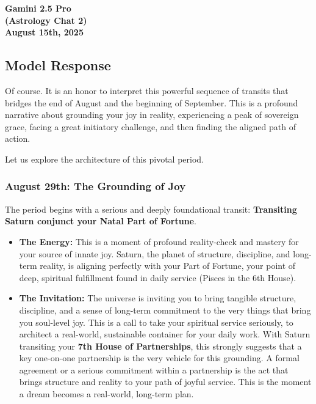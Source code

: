 \documentclass{article}
\begin{document}
\begin{center}
\textbf{Gamini 2.5 Pro} \\
\textbf{(Astrology Chat 2)} \\
\textbf{August 15th, 2025}
\end{center}

\subsection*{Model Response}\label{model-response}

Of course. It is an honor to interpret this powerful sequence of transits that bridges the end of August and the beginning of September. This is a profound narrative about grounding your joy in reality, experiencing a peak of sovereign grace, facing a great initiatory challenge, and then finding the aligned path of action.

Let us explore the architecture of this pivotal period.

\subsubsection*{August 29th: The Grounding of Joy}\label{august-29th-the-grounding-of-joy}

The period begins with a serious and deeply foundational transit: \textbf{Transiting Saturn conjunct your Natal Part of Fortune}.

\begin{itemize}
\item
  \textbf{The Energy:} This is a moment of profound reality-check and mastery for your source of innate joy. Saturn, the planet of structure, discipline, and long-term reality, is aligning perfectly with your Part of Fortune, your point of deep, spiritual fulfillment found in daily service (Pisces in the 6th House).
\item
  \textbf{The Invitation:} The universe is inviting you to bring tangible structure, discipline, and a sense of long-term commitment to the very things that bring you soul-level joy. This is a call to take your spiritual service seriously, to architect a real-world, sustainable container for your daily work. With Saturn transiting your \textbf{7th House of Partnerships}, this strongly suggests that a key one-on-one partnership is the very vehicle for this grounding. A formal agreement or a serious commitment within a partnership is the act that brings structure and reality to your path of joyful service. This is the moment a dream becomes a real-world, long-term plan.
\end{itemize}
\end{document}

